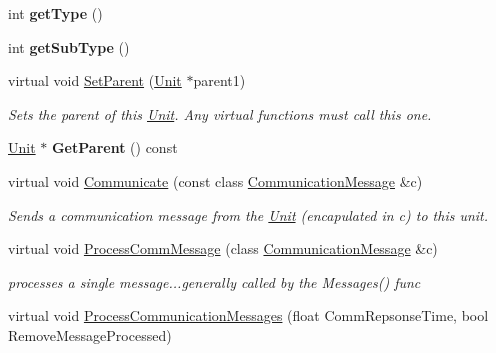 \begin{DoxyCompactItemize}
\item 
int {\bfseries get\+Type} ()\hypertarget{classOrder_aae6cb78b6f9eb67238ad2394244dadba}{}\label{classOrder_aae6cb78b6f9eb67238ad2394244dadba}

\item 
int {\bfseries get\+Sub\+Type} ()\hypertarget{classOrder_af4f410e366cc6496b5bbd2fcc1578619}{}\label{classOrder_af4f410e366cc6496b5bbd2fcc1578619}

\item 
virtual void \hyperlink{classOrder_a3b6f372e416a4207e8e7ac2d6a0c4b31}{Set\+Parent} (\hyperlink{classUnit}{Unit} $\ast$parent1)\hypertarget{classOrder_a3b6f372e416a4207e8e7ac2d6a0c4b31}{}\label{classOrder_a3b6f372e416a4207e8e7ac2d6a0c4b31}

\begin{DoxyCompactList}\small\item\em Sets the parent of this \hyperlink{classUnit}{Unit}. Any virtual functions must call this one. \end{DoxyCompactList}\item 
\hyperlink{classUnit}{Unit} $\ast$ {\bfseries Get\+Parent} () const \hypertarget{classOrder_a564a861fecaf28898452e041da1cc9df}{}\label{classOrder_a564a861fecaf28898452e041da1cc9df}

\item 
virtual void \hyperlink{classOrder_a446aaf1fe8549a930b572bf1c9ed84d2}{Communicate} (const class \hyperlink{classCommunicationMessage}{Communication\+Message} \&c)\hypertarget{classOrder_a446aaf1fe8549a930b572bf1c9ed84d2}{}\label{classOrder_a446aaf1fe8549a930b572bf1c9ed84d2}

\begin{DoxyCompactList}\small\item\em Sends a communication message from the \hyperlink{classUnit}{Unit} (encapulated in c) to this unit. \end{DoxyCompactList}\item 
virtual void \hyperlink{classOrder_a321debaa992d6f8db3f3d22c35fbb933}{Process\+Comm\+Message} (class \hyperlink{classCommunicationMessage}{Communication\+Message} \&c)\hypertarget{classOrder_a321debaa992d6f8db3f3d22c35fbb933}{}\label{classOrder_a321debaa992d6f8db3f3d22c35fbb933}

\begin{DoxyCompactList}\small\item\em processes a single message...generally called by the Messages() func \end{DoxyCompactList}\item 
virtual void \hyperlink{classOrder_abcc39777edfc62e73c01832e10bf8d4c}{Process\+Communication\+Messages} (float Comm\+Repsonse\+Time, bool Remove\+Message\+Processed)\hypertarget{classOrder_abcc39777edfc62e73c01832e10bf8d4c}{}\label{classOrder_abcc39777edfc62e73c01832e10bf8d4c}


\end{DoxyCompactItemize}

